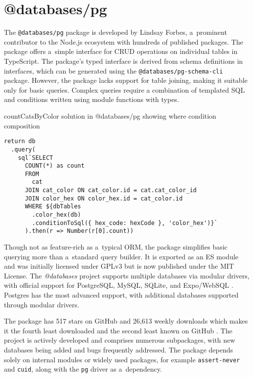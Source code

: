\section{@databases/pg}
The \texttt{@databases/pg} package is developed by Lindsay Forbes, a~prominent
contributor to the Node.js ecosystem with hundreds of published packages. The
package offers a~simple interface for CRUD operations on individual tables in
TypeScript. The package's typed interface is derived from schema definitions in
interfaces, which can be generated using the \texttt{@databases/pg-schema-cli}
\cite{pg-schema-cli} package. However, the package lacks support for table
joining, making it suitable only for basic queries. Complex queries require a
combination of templated SQL and conditions written using module functions with
types.

\begin{listing}
    \caption{countCatsByColor solution in @databases/pg showing where condition composition}
    \label{lst:atdatabases/example}
    \begin{verbatim}
return db
  .query(
    sql`SELECT
      COUNT(*) as count
      FROM
        cat
      JOIN cat_color ON cat_color.id = cat.cat_color_id
      JOIN color_hex ON color_hex.id = cat_color.id
      WHERE ${dbTables
        .color_hex(db)
        .conditionToSql({ hex_code: hexCode }, 'color_hex')}`
      ).then(r => Number(r[0].count))
    \end{verbatim}
\end{listing}

Though not as feature-rich as a~typical ORM, the package simplifies basic
querying more than a~standard query builder. It is exported as an ES module and
was initially licensed under GPLv3 but is now published under the MIT License.
The \textit{@databases} project supports multiple databases via modular drivers,
with official support for PostgreSQL, MySQL, SQLite, and Expo/WebSQL
\cite{databases/pg}. Postgres has the most advanced support, with additional
databases supported through modular drivers.

The package has 517 stars on GitHub and 26,613 weekly downloads which makes it
the fourth least downloaded and the second least known on GitHub
\cite{databases/pg/npm}. The project is actively developed and comprises
numerous subpackages, with new databases being added and bugs frequently
addressed. The package depends solely on internal modules or widely used
packages, for example \texttt{assert-never} and \texttt{cuid}, along with the
\texttt{pg} driver as a~dependency.

